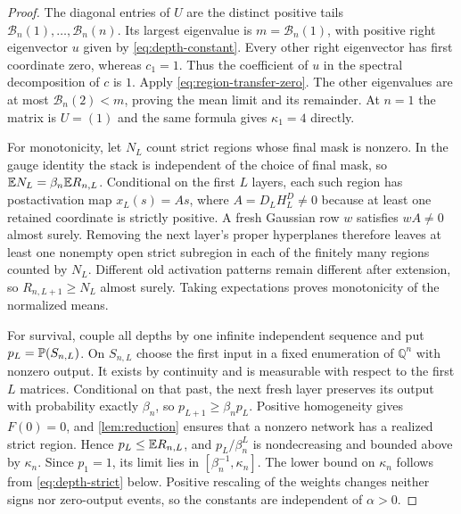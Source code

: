 \begin{proof}
The diagonal entries of $U$ are the distinct positive tails $\mathcal B_n(1),\ldots,\mathcal B_n(n)$. Its largest eigenvalue is $m=\mathcal B_n(1)$, with positive right eigenvector $u$ given by \cref{eq:depth-constant}. Every other right eigenvector has first coordinate zero, whereas $c_1=1$. Thus the coefficient of $u$ in the spectral decomposition of $c$ is $1$. Apply \cref{eq:region-transfer-zero}. The other eigenvalues are at most $\mathcal B_n(2)<m$, proving the mean limit and its remainder. At $n=1$ the matrix is $U=(1)$ and the same formula gives $\kappa_1=4$ directly.

For monotonicity, let $N_L$ count strict regions whose final mask is nonzero. In the gauge identity the stack is independent of the choice of final mask, so $\mathbb{E} N_L=\beta_n\mathbb{E} R_{n,L}$. Conditional on the first $L$ layers, each such region has postactivation map $x_L(s)=A s$, where $A=D_LH_L^D\ne0$ because at least one retained coordinate is strictly positive. A fresh Gaussian row $w$ satisfies $wA\ne0$ almost surely. Removing the next layer's proper hyperplanes therefore leaves at least one nonempty open strict subregion in each of the finitely many regions counted by $N_L$. Different old activation patterns remain different after extension, so $R_{n,L+1}\ge N_L$ almost surely. Taking expectations proves monotonicity of the normalized means.

For survival, couple all depths by one infinite independent sequence and put $p_L=\mathbb{P}(S_{n,L})$. On $S_{n,L}$ choose the first input in a fixed enumeration of $\mathbb Q^n$ with nonzero output. It exists by continuity and is measurable with respect to the first $L$ matrices. Conditional on that past, the next fresh layer preserves its output with probability exactly $\beta_n$, so $p_{L+1}\ge\beta_np_L$. Positive homogeneity gives $F(0)=0$, and \cref{lem:reduction} ensures that a nonzero network has a realized strict region. Hence $p_L\le\mathbb{E} R_{n,L}$, and $p_L/\beta_n^L$ is nondecreasing and bounded above by $\kappa_n$. Since $p_1=1$, its limit lies in $[\beta_n^{-1},\kappa_n]$. The lower bound on $\kappa_n$ follows from \cref{eq:depth-strict} below. Positive rescaling of the weights changes neither signs nor zero-output events, so the constants are independent of $\alpha>0$.
\end{proof}


